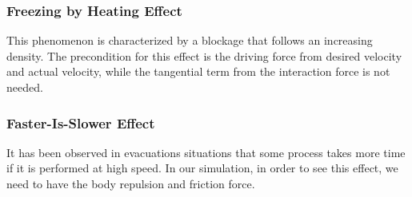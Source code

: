 \subsubsection{Freezing by Heating Effect}
This phenomenon is characterized by a blockage that follows an increasing 
density. The precondition for this effect is the driving force from desired 
velocity and actual velocity, while the tangential term from the interaction 
force is not needed.

\subsubsection{Faster-Is-Slower Effect}
It has been observed in evacuations situations that some process takes more 
time if it is performed at high speed. In our simulation, in order to see this 
effect, we need to have the body repulsion and friction force.
